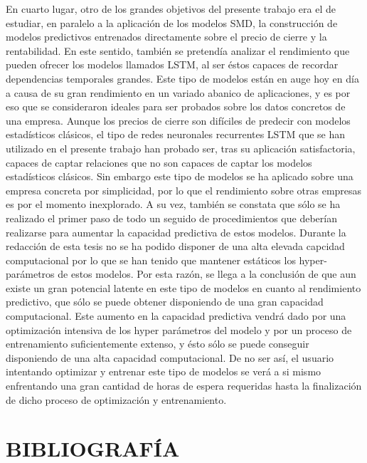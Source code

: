 \documentclass[]{DissertateUSU}
\begin{document}
\noindent En cuarto lugar, otro de los grandes objetivos del presente
trabajo era el de estudiar, en paralelo a la aplicación de los modelos
SMD, la construcción de modelos predictivos entrenados directamente
sobre el precio de cierre y la rentabilidad. En este sentido, también se
pretendía analizar el rendimiento que pueden ofrecer los modelos
llamados LSTM, al ser éstos capaces de recordar dependencias temporales
grandes. Este tipo de modelos están en auge hoy en día a causa de su
gran rendimiento en un variado abanico de aplicaciones, y es por eso que
se consideraron ideales para ser probados sobre los datos concretos de
una empresa. Aunque los precios de cierre son difíciles de predecir con
modelos estadísticos clásicos, el tipo de redes neuronales recurrentes
LSTM que se han utilizado en el presente trabajo han probado ser, tras
su aplicación satisfactoria, capaces de captar relaciones que no son
capaces de captar los modelos estadísticos clásicos. Sin embargo este
tipo de modelos se ha aplicado sobre una empresa concreta por
simplicidad, por lo que el rendimiento sobre otras empresas es por el
momento inexplorado. A su vez, también se constata que sólo se ha
realizado el primer paso de todo un seguido de procedimientos que
deberían realizarse para aumentar la capacidad predictiva de estos
modelos. Durante la redacción de esta tesis no se ha podido disponer de
una alta elevada capcidad computacional por lo que se han tenido que
mantener estáticos los hyper-parámetros de estos modelos. Por esta
razón, se llega a la conclusión de que aun existe un gran potencial
latente en este tipo de modelos en cuanto al rendimiento predictivo, que
sólo se puede obtener disponiendo de una gran capacidad computacional.
Este aumento en la capacidad predictiva vendrá dado por una optimización
intensiva de los hyper parámetros del modelo y por un proceso de
entrenamiento suficientemente extenso, y ésto sólo se puede conseguir
disponiendo de una alta capacidad computacional. De no ser así, el
usuario intentando optimizar y entrenar este tipo de modelos se verá a
si mismo enfrentando una gran cantidad de horas de espera requeridas
hasta la finalización de dicho proceso de optimización y entrenamiento.

\FloatBarrier
\newpage
{}
\fancyhead[R]{\thepage}
\fancyfoot[C]{}

\chapter{\textbf{\hspace{1pt} BIBLIOGRAFÍA}}
\end{document}
